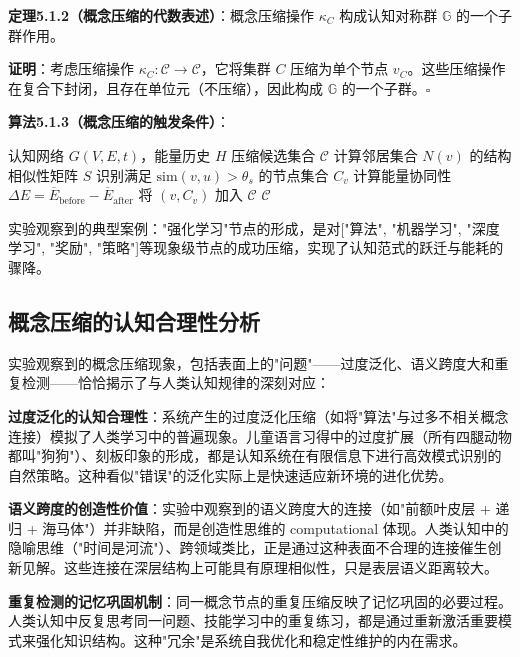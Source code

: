 \documentclass[12pt,a4paper]{article}
\newcommand{\cognitivespace}{\mathcal{C}}
\newcommand{\cognitivegroup}{\mathbb{G}}
\begin{document}
\textbf{定理5.1.2（概念压缩的代数表述）}：概念压缩操作 $\kappa_C$ 构成认知对称群 $\cognitivegroup$ 的一个子群作用。

\textbf{证明}：考虑压缩操作 $\kappa_C: \cognitivespace \rightarrow \cognitivespace$，它将集群 $C$ 压缩为单个节点 $v_C$。这些压缩操作在复合下封闭，且存在单位元（不压缩），因此构成 $\cognitivegroup$ 的一个子群。$\square$

\textbf{算法5.1.3（概念压缩的触发条件）}：
\begin{algorithm}
\caption{概念压缩的触发条件}
\begin{algorithmic}[1]
\Require 认知网络 $G(V,E,t)$，能量历史 $H$
\Ensure 压缩候选集合 $\mathcal{C}$
    \State 计算邻居集合 $N(v)$ 的结构相似性矩阵 $S$
    \State 识别满足 $\text{sim}(v,u) > \theta_s$ 的节点集合 $C_v$
        \State 计算能量协同性 $\Delta E = \overline{E}_{\text{before}} - \overline{E}_{\text{after}}$
            \State 将 $(v, C_v)$ 加入 $\mathcal{C}$
        \EndIf
    \EndIf
\EndFor
\State \Return $\mathcal{C}$
\end{algorithmic}
\end{algorithm}

实验观察到的典型案例："强化学习"节点的形成，是对["算法", "机器学习", "深度学习", "奖励", "策略"]等现象级节点的成功压缩，实现了认知范式的跃迁与能耗的骤降。
\subsection{概念压缩的认知合理性分析}

实验观察到的概念压缩现象，包括表面上的"问题"——过度泛化、语义跨度大和重复检测——恰恰揭示了与人类认知规律的深刻对应：

\textbf{过度泛化的认知合理性}：系统产生的过度泛化压缩（如将"算法"与过多不相关概念连接）模拟了人类学习中的普遍现象。儿童语言习得中的过度扩展（所有四腿动物都叫"狗狗"）、刻板印象的形成，都是认知系统在有限信息下进行高效模式识别的自然策略。这种看似"错误"的泛化实际上是快速适应新环境的进化优势。

\textbf{语义跨度的创造性价值}：实验中观察到的语义跨度大的连接（如"前额叶皮层 + 递归 + 海马体"）并非缺陷，而是创造性思维的 computational 体现。人类认知中的隐喻思维（"时间是河流"）、跨领域类比，正是通过这种表面不合理的连接催生创新见解。这些连接在深层结构上可能具有原理相似性，只是表层语义距离较大。

\textbf{重复检测的记忆巩固机制}：同一概念节点的重复压缩反映了记忆巩固的必要过程。人类认知中反复思考同一问题、技能学习中的重复练习，都是通过重新激活重要模式来强化知识结构。这种"冗余"是系统自我优化和稳定性维护的内在需求。
\end{document}
